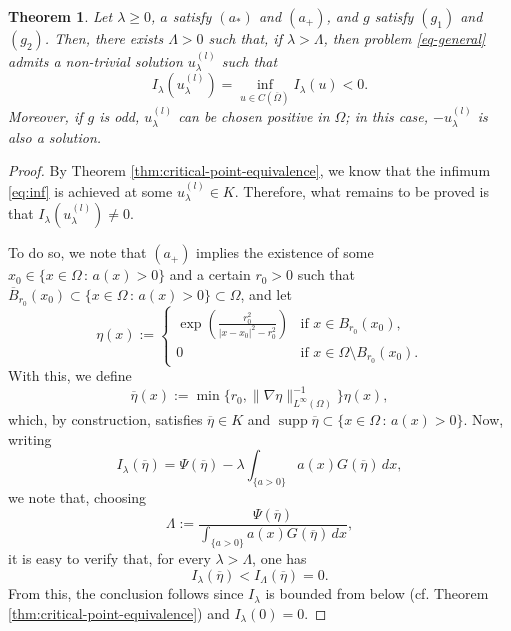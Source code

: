 \documentclass[11pt,reqno]{amsart}
\theoremstyle{plain}
\newtheorem{theorem}{Theorem}[section]
\theoremstyle{definition}
\numberwithin{equation}{section}
\begin{document}
\begin{theorem} \label{thm:GS}
Let $\lambda \geq0$, $a$ satisfy $(a_*)$ and $(a_+)$, and $g$ satisfy $(g_1)$ and $(g_2)$. Then, there exists $\Lambda>0$ such that, if $\lambda > \Lambda$, then problem \eqref{eq-general} admits a non-trivial solution $u_\lambda^{(l)}$ such that
\begin{equation} \label{eq:inf} I_\lambda(u_\lambda^{(l)}) = \inf_{u \in C(\overline{\Omega})} I_\lambda (u) < 0.\end{equation}
Moreover, if $g$ is odd, $u_\lambda^{(l)}$ can be chosen positive
in $\Omega$; in this case, $-u_\lambda^{(l)}$ is also a solution.

\end{theorem}
\begin{proof}
    By Theorem \ref{thm:critical-point-equivalence}, we know that the infimum \eqref{eq:inf} is achieved at some $u_\lambda^{(l)} \in K$. Therefore, what remains to be proved is that $I_\lambda(u_\lambda^{(l)}) \not= 0.$ 

    \medskip
    To do so, we note that $(a_+)$ implies the existence of some $x_0 \in \{ x \in \Omega \, : \, a(x) > 0 \}$ and a certain $r_0>0$ such that $\overline B_{r_0}(x_0) \subset \{ x \in \Omega \, : \, a(x) > 0 \} \subset \Omega$, and let 
    \begin{equation} \label{def:eta}\eta(x) :=
\begin{cases} \exp\left( \frac{r_0^2}{|x-x_0|^2 - r_{0}^2} \right) &\text{if } x \in B_{r_0}(x_0),\\
0 & \text{if } x \in \Omega \setminus B_{r_0}(x_0).
\end{cases}\end{equation}
With this, we define \begin{equation} \label{def:etabar} \overline \eta (x) := \min\{ r_0, \|\nabla \eta \|^{-1}_{L^\infty(\Omega)}\}\eta(x) ,\end{equation} which, by construction, satisfies $\overline \eta \in K$ and $\operatorname{supp} \overline \eta \subset \{ x \in \Omega \, : \, a(x) > 0 \}$.  Now, writing
$$I_\lambda(\overline{\eta}) = \Psi (\overline{\eta}) - \lambda \int_{\{a > 0 \} } a(x) G(\overline \eta ) \, dx, $$
we note that, choosing
\begin{equation} \label{def:Lambda} \Lambda := \frac{\Psi(\overline \eta)}{\int_{\{a >  0\}} a(x) G(\overline{\eta})\, dx} ,\end{equation}
it is easy to verify that, for every $\lambda > \Lambda $, one has 
$$I_\lambda (\overline \eta) < I_\Lambda (\overline \eta) = 0.$$
From this, the conclusion follows since $I_\lambda $ is bounded from below (cf. Theorem \ref{thm:critical-point-equivalence}) and $I_\lambda(0) = 0$.


\end{proof}
\end{document}
